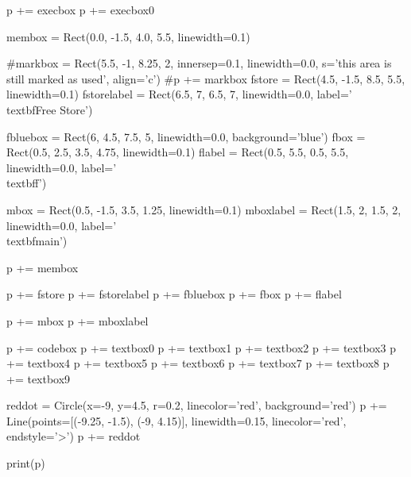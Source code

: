 \begin{python}
p += execbox
p += execbox0

membox = Rect(0.0, -1.5, 4.0, 5.5, linewidth=0.1)

#markbox = Rect(5.5, -1, 8.25, 2, innersep=0.1, linewidth=0.0, s='this area is still marked as used', align='c')
#p += markbox
fstore = Rect(4.5, -1.5, 8.5, 5.5, linewidth=0.1)
fstorelabel = Rect(6.5, 7, 6.5, 7, linewidth=0.0, label='\\textbf{Free Store}')

fbluebox = Rect(6, 4.5, 7.5, 5, linewidth=0.0, background='blue')
fbox = Rect(0.5, 2.5, 3.5, 4.75, linewidth=0.1)
flabel = Rect(0.5, 5.5, 0.5, 5.5, linewidth=0.0, label='\\textbf{f}')

mbox = Rect(0.5, -1.5, 3.5, 1.25, linewidth=0.1)
mboxlabel = Rect(1.5, 2, 1.5, 2, linewidth=0.0, label='\\textbf{main}')

p += membox

p += fstore
p += fstorelabel
p += fbluebox
p += fbox
p += flabel

p += mbox
p += mboxlabel

p += codebox
p += textbox0
p += textbox1
p += textbox2
p += textbox3
p += textbox4
p += textbox5
p += textbox6
p += textbox7
p += textbox8
p += textbox9

reddot = Circle(x=-9, y=4.5, r=0.2, linecolor='red', background='red')
p += Line(points=[(-9.25, -1.5), (-9, 4.15)], linewidth=0.15, linecolor='red', endstyle='>')
p += reddot

print(p)
\end{python}


